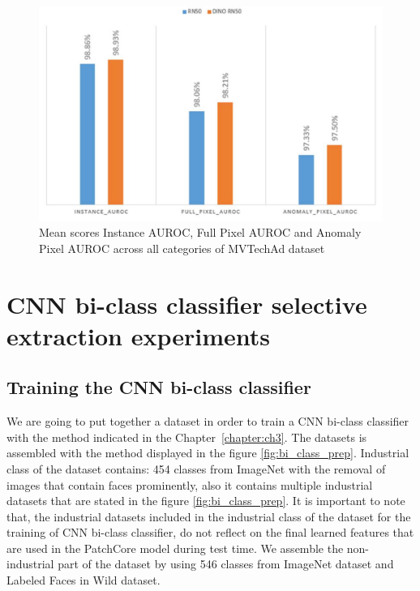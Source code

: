 \begin{figure}[h]
	\begin{center}
		\includegraphics[width=1.0\linewidth]{Chapter_4/dino.png}
	\end{center}
	\caption{Mean scores Instance AUROC, Full Pixel AUROC and Anomaly Pixel AUROC across all categories of MVTechAd dataset}
	\label{fig:dino_test}
\end{figure}

\section{CNN bi-class classifier selective extraction experiments}
\label{sec:comp_vis}

\subsection{Training the CNN bi-class classifier}
We are going to put together a dataset in order to train a CNN bi-class classifier with the method indicated in the Chapter~\ref{chapter:ch3}. The datasets is assembled with the method displayed in the figure \ref{fig:bi_class_prep}. Industrial class of the dataset contains: 454 classes from ImageNet with the removal of images that contain faces prominently, also it contains multiple industrial datasets that are stated in the figure \ref{fig:bi_class_prep}. It is important to note that, the industrial datasets included in the industrial class of the dataset for the training of CNN bi-class classifier, do not reflect on the final learned features that are used in the PatchCore model during test time. We assemble the non-industrial part of the dataset by using 546 classes from ImageNet dataset and Labeled Faces in Wild dataset.

